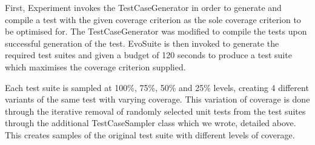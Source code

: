 \documentclass[titlepage]{article}
\begin{document}
First, Experiment invokes the TestCaseGenerator in order to generate and compile a test with the given coverage criterion as the sole coverage criterion to be optimised for. The TestCaseGenerator was modified to compile the tests upon successful generation of the test. EvoSuite is then invoked to generate the required test suites and given a budget of 120 seconds to produce a test suite which maximises the coverage criterion supplied.

Each test suite is sampled at 100\%, 75\%, 50\% and 25\% levels, creating 4 different variants of the same test with varying coverage. This variation of coverage is done through the iterative removal of randomly selected unit tests from the test suites through the additional TestCaseSampler class which we wrote, detailed above. This creates samples of the original test suite with different levels of coverage. 
\end{document}
